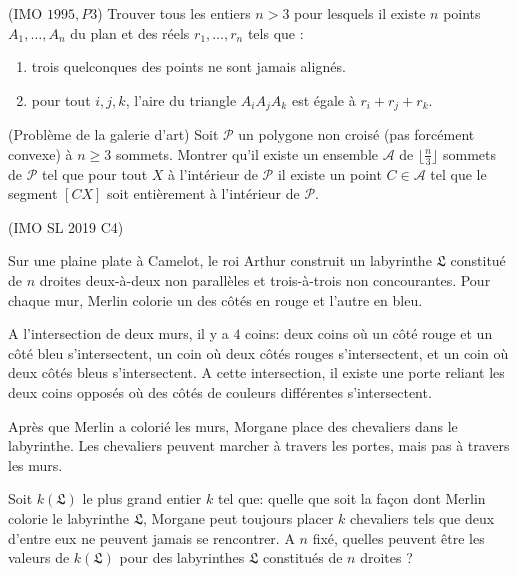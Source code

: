 \begin{exo}
(IMO $1995,P3$) Trouver tous les entiers $n > 3$ pour lesquels il existe $n$ points $A_1, \dots, A_n$
du plan et des réels $r_1, \dots, r_n$ tels que :
\begin{enumerate}
    \item trois quelconques des points ne sont jamais alignés.
    \item pour tout ${i, j, k}$, l’aire du triangle $A_iA_jA_k$ est égale à $r_i + r_j + r_k$.
\end{enumerate}
\end{exo}

\begin{exo}
(Problème de la galerie d’art) Soit $\mathcal{P}$ un polygone non croisé (pas forcément convexe) à $n\ge 3$ sommets. Montrer qu’il existe un ensemble $\mathcal{A}$ de $\lfloor\frac n3\rfloor$ sommets de $\mathcal{P}$ tel que pour tout $X$ à l’intérieur de $\mathcal{P}$ il existe un point $C\in\mathcal{A}$ tel que le segment $[CX]$ soit entièrement à l’intérieur de $\mathcal{P}$.
\end{exo}

\begin{exo}
(IMO SL 2019 C4)

Sur une plaine plate à Camelot, le roi Arthur construit un labyrinthe $\mathfrak{L}$ constitué de $n$ droites deux-à-deux non parallèles et trois-à-trois non concourantes. Pour chaque mur, Merlin colorie un des côtés en rouge et l'autre en bleu.

A l'intersection de deux murs, il y a $4$ coins: deux coins où un côté rouge et un côté bleu s'intersectent, un coin où deux côtés rouges s'intersectent, et un coin où deux côtés bleus s'intersectent. A cette intersection, il existe une porte reliant les deux coins opposés où des côtés de couleurs différentes s'intersectent.

Après que Merlin a colorié les murs, Morgane place des chevaliers dans le labyrinthe. Les chevaliers peuvent marcher à travers les portes, mais pas à travers les murs.

Soit $k(\mathfrak{L})$ le plus grand entier $k$ tel que: quelle que soit la façon dont Merlin colorie le labyrinthe $\mathfrak{L}$, Morgane peut toujours placer $k$ chevaliers tels que deux d'entre eux ne peuvent jamais se rencontrer. A $n$ fixé, quelles peuvent être les valeurs de $k(\mathfrak{L})$ pour des labyrinthes $\mathfrak{L}$ constitués de $n$ droites ?
\end{exo}

